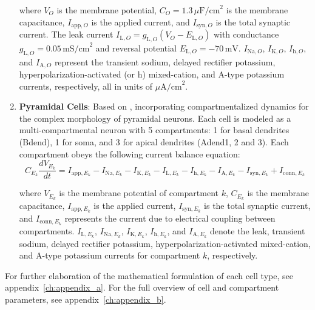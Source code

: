 \begin{enumerate}
          where \(V_O\) is the membrane potential, \(C_O = 1.3 \, \mu\text{F/cm}^2\) is
          the membrane capacitance, \(I_{\text{app},O}\) is the applied current, and
          \(I_{\text{syn},O}\) is the total synaptic current. The leak current
          \(I_{\text{L},O} = g_{\text{L},O}(V_O - E_{\text{L},O})\) with conductance
          \(g_{\text{L},O} = 0.05 \, \text{mS/cm}^2\) and reversal potential
          \(E_{\text{L},O} = -70 \, \text{mV}\). \(I_{\text{Na},O}\), \(I_{\text{K},O}\),
          \(I_{\text{h},O}\), and \(I_{\text{A},O}\) represent the transient sodium,
          delayed rectifier potassium, hyperpolarization-activated (or h) mixed-cation,
          and A-type potassium currents, respectively, all in units of
          \(\mu\text{A/cm}^2\).
    \item \textbf{Pyramidal Cells}: Based on \textcite{miglioreDendriticIhSelectivelyBlocks2004},
          incorporating compartmentalized dynamics for the complex morphology of pyramidal neurons.
          Each cell is modeled as a multi-compartmental neuron with 5 compartments: 1 for basal dendrites (Bdend),
          1 for soma, and 3 for apical dendrites (Adend1, 2 and 3). Each compartment obeys the following current balance equation:
          \begin{equation}\label{eq:pyramidal_cell}
              C_{E_k} \frac{dV_{E_k}}{dt} = I_{\text{app},E_k} - I_{\text{Na},E_k} - I_{\text{K},E_k} - I_{\text{L},E_k} - I_{\text{h},E_k} - I_{\text{A},E_k} - I_{\text{syn},E_k} + I_{\text{conn},E_k}
          \end{equation}

          where \(V_{E_k}\) is the membrane potential of compartment \(k\), \(C_{E_k}\)
          is the membrane capacitance, \(I_{\text{app},E_k}\) is the applied current,
          \(I_{\text{syn},E_k}\) is the total synaptic current, and
          \(I_{\text{conn},E_k}\) represents the current due to electrical coupling
          between compartments. \(I_{\text{L},E_k}\), \(I_{\text{Na},E_k}\),
          \(I_{\text{K},E_k}\), \(I_{\text{h},E_k}\), and \(I_{\text{A},E_k}\) denote the
          leak, transient sodium, delayed rectifier potassium,
          hyperpolarization-activated mixed-cation, and A-type potassium currents for
          compartment \(k\), respectively.
\end{enumerate}

\noindent For further elaboration of the mathematical formulation of each cell type, see appendix~\ref{ch:appendix_a}.
For the full overview of cell and compartment parameters, see appendix~\ref{ch:appendix_b}.

